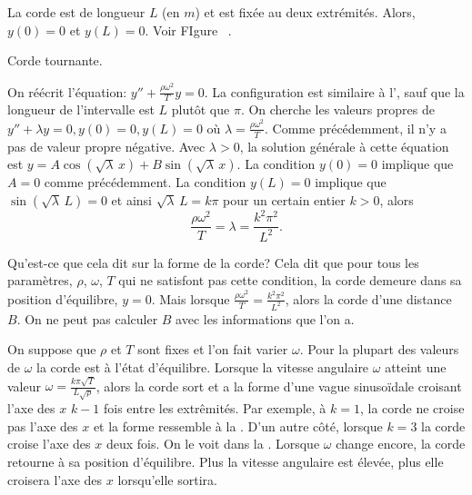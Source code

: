La corde  est de longueur $L$ (en $m$) et est fixée au deux extrémités. Alors, $y(0) = 0$ et $y(L) = 0$.  Voir FIgure~
.

\begin{myfig}
\capstart
{}
\caption{Corde tournante.\label{bvp:whirstringfig}}
\end{myfig}

On réécrit l'équation: 
$y'' + \frac{\rho \omega^2}{T} y = 0$.
La configuration est similaire à l', sauf que  
la longueur de l'intervalle est $L$ plutôt que $\pi$.  On cherche les valeurs propres de  $y'' + \lambda y = 0, y(0) = 0, y(L) = 0$ où
$\lambda = \frac{\rho \omega^2}{T}$.  Comme précédemment, il n'y a pas de valeur propre négative. Avec $\lambda > 0$,
la solution générale à cette équation est $y = A \cos (  \sqrt{\lambda} \,x ) + B
\sin ( \sqrt{\lambda} \,x )$.  La condition $y(0) = 0$ implique que $A = 0$ comme précédemment. La condition $y(L) = 0$ implique que
$\sin ( \sqrt{\lambda} \, L) = 0$ et ainsi
$\sqrt{\lambda} \, L = k \pi$  pour un certain entier $k > 0$, alors
\begin{equation*}
\frac{\rho \omega^2}{T} = \lambda = \frac{k^2 \pi^2}{L^2} .
\end{equation*}

Qu'est-ce que cela dit sur la forme de la corde? Cela dit que pour tous les paramètres, $\rho$, $\omega$, $T$ qui ne satisfont pas cette condition, la corde demeure dans sa position d'équilibre, $y=0$.  Mais lorsque 
$\frac{\rho \omega^2}{T} = \frac{k^2 \pi^2}{L^2}$, alors la corde  d'une distance $B$. On ne peut pas calculer $B$ avec les informations que l'on a. 

On suppose que  $\rho$ et $T$ sont fixes et l'on fait varier $\omega$.
Pour la plupart des valeurs de $\omega$ la corde est à l'état d'équilibre. Lorsque la vitesse angulaire  $\omega$ atteint une valeur $\omega = \frac{k \pi \sqrt{T}}{L\sqrt{\rho}}$, alors la corde sort et a la forme d'une vague sinusoïdale croisant l'axe des 
$x$ $k-1$ fois entre les extrêmités. Par exemple, à $k=1$, la corde ne croise pas l'axe des $x$ et la forme ressemble à la .
D'un autre côté, lorsque  $k=3$ la corde croise l'axe des  $x$ deux fois. On le voit dans la  .
Lorsque $\omega$ change encore, la corde retourne à sa position d'équilibre. Plus la vitesse angulaire est élevée, plus elle croisera l'axe des  $x$ lorsqu'elle sortira. 

